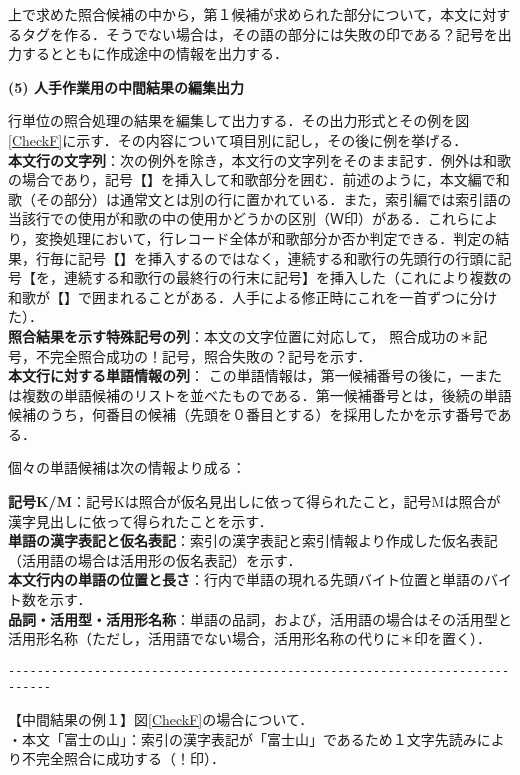 上で求めた照合候補の中から，第１候補が求められた部分について，本文に対するタグを作る．そうでない場合は，その語の部分には失敗の印である？記号を出力するとともに作成途中の情報を出力する．


\noindent
{\bf (5) 人手作業用の中間結果の編集出力}

行単位の照合処理の結果を編集して出力する．その出力形式とその例を図\ref{CheckF}に示す．その内容について項目別に記し，その後に例を挙げる．
\\
\noindent
{\bf 本文行の文字列}：次の例外を除き，本文行の文字列をそのまま記す．例外は和歌の場合であり，記号【】を挿入して和歌部分を囲む．前述のように，本文編で和歌（その部分）は通常文とは別の行に置かれている．また，索引編では索引語の当該行での使用が和歌の中の使用かどうかの区別（Ｗ印）がある．これらにより，変換処理において，行レコード全体が和歌部分か否か判定できる．判定の結果，行毎に記号【】を挿入するのではなく，連続する和歌行の先頭行の行頭に記号【を，連続する和歌行の最終行の行末に記号】を挿入した（これにより複数の和歌が【】で囲まれることがある．人手による修正時にこれを一首ずつに分けた）．
\\
\noindent
{\bf 照合結果を示す特殊記号の列}：本文の文字位置に対応して，
照合成功の＊記号，不完全照合成功の！記号，照合失敗の？記号を示す．
\\
\noindent
{\bf 本文行に対する単語情報の列}：
この単語情報は，第一候補番号の後に，一または複数の単語候補のリストを並べたものである．第一候補番号とは，後続の単語候補のうち，何番目の候補（先頭を０番目とする）を採用したかを示す番号である．

個々の単語候補は次の情報より成る：

\noindent
{\bf 記号K/M}：記号Kは照合が仮名見出しに依って得られたこと，記号Mは照合が漢字見出しに依って得られたことを示す．
\\
{\bf 単語の漢字表記と仮名表記}：索引の漢字表記と索引情報より作成した仮名表記（活用語の場合は活用形の仮名表記）を示す．
\\
{\bf 本文行内の単語の位置と長さ}：行内で単語の現れる先頭バイト位置と単語のバイト数を示す．
\\
{\bf 品詞・活用型・活用形名称}：単語の品詞，および，活用語の場合はその活用型と活用形名称（ただし，活用語でない場合，活用形名称の代りに＊印を置く）．

\begin{verbatim}
----------------------------------------------------------------------------
\end{verbatim}
【中間結果の例１】図\ref{CheckF}の場合について．
\\
・本文「富士の山」：索引の漢字表記が「富士山」であるため１文字先読みにより不完全照合に成功する（！印）．

